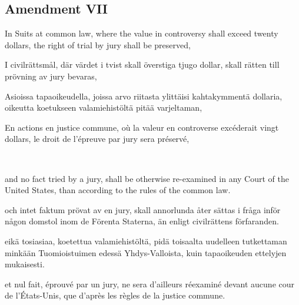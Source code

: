 \documentclass[a4paper,landscape,12pt]{article}
\begin{document}
\subsection*{Amendment VII}
\begin{minipage}[t]{0.22\textwidth}
In Suits at common law, where the value in controversy shall exceed twenty dollars, the right of trial by jury shall be preserved,
\end{minipage}\textwidth
\begin{minipage}[t]{0.22\textwidth}
I civilrättsmål, där värdet i tvist skall överstiga tjugo dollar, skall rätten till prövning av jury bevaras,
\end{minipage}\textwidth
\begin{minipage}[t]{0.22\textwidth}
Asioissa tapaoikeudella, joissa arvo riitasta ylittäisi kahtakymmentä dollaria, oikeutta koetukseen valamiehistöltä pitää varjeltaman,
\end{minipage}\textwidth
\begin{minipage}[t]{0.22\textwidth}
En actions en justice commune, où la valeur en controverse excéderait vingt dollars, le droit de l'épreuve par jury sera préservé,
\end{minipage}

~

\begin{minipage}[t]{0.22\textwidth}
and no fact tried by a jury, shall be otherwise re-examined in any Court of the United States, than according to the rules of the common law.
\end{minipage}\textwidth
\begin{minipage}[t]{0.22\textwidth}
och intet faktum prövat av en jury, skall annorlunda åter sättas i fråga inför någon domstol inom de Förenta Staterna, än enligt civilrättens förfaranden.
\end{minipage}\textwidth
\begin{minipage}[t]{0.22\textwidth}
eikä tosiasiaa, koetettua valamiehistöltä, pidä toisaalta uudelleen tutkettaman minkään Tuomioistuimen edessä Yhdys-Valloista, kuin tapaoikeuden ettelyjen mukaisesti.
\end{minipage}\textwidth
\begin{minipage}[t]{0.22\textwidth}
et nul fait, éprouvé par un jury, ne sera d'ailleurs réexaminé devant aucune cour de l'États-Unis, que d'après les règles de la justice commune.
\end{minipage}
\end{document}
